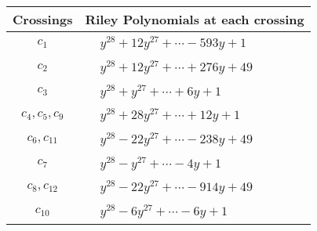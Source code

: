 \documentclass[1p]{elsarticle_modified}
\theoremstyle{definition}
\begin{document}
\begin{tabular}{m{50pt}|m{274pt}}
Crossings & \hspace{64pt}Riley Polynomials at each crossing \\
\hline $$\begin{aligned}c_{1}\end{aligned}$$&$\begin{aligned}
&y^{28}+12 y^{27}+\cdots-593 y+1
\end{aligned}$\\
\hline $$\begin{aligned}c_{2}\end{aligned}$$&$\begin{aligned}
&y^{28}+12 y^{27}+\cdots+276 y+49
\end{aligned}$\\
\hline $$\begin{aligned}c_{3}\end{aligned}$$&$\begin{aligned}
&y^{28}+y^{27}+\cdots+6 y+1
\end{aligned}$\\
\hline $$\begin{aligned}c_{4},c_{5},c_{9}\end{aligned}$$&$\begin{aligned}
&y^{28}+28 y^{27}+\cdots+12 y+1
\end{aligned}$\\
\hline $$\begin{aligned}c_{6},c_{11}\end{aligned}$$&$\begin{aligned}
&y^{28}-22 y^{27}+\cdots-238 y+49
\end{aligned}$\\
\hline $$\begin{aligned}c_{7}\end{aligned}$$&$\begin{aligned}
&y^{28}- y^{27}+\cdots-4 y+1
\end{aligned}$\\
\hline $$\begin{aligned}c_{8},c_{12}\end{aligned}$$&$\begin{aligned}
&y^{28}-22 y^{27}+\cdots-914 y+49
\end{aligned}$\\
\hline $$\begin{aligned}c_{10}\end{aligned}$$&$\begin{aligned}
&y^{28}-6 y^{27}+\cdots-6 y+1
\end{aligned}$\\
\hline
\end{tabular}\\~\\
\end{document}
